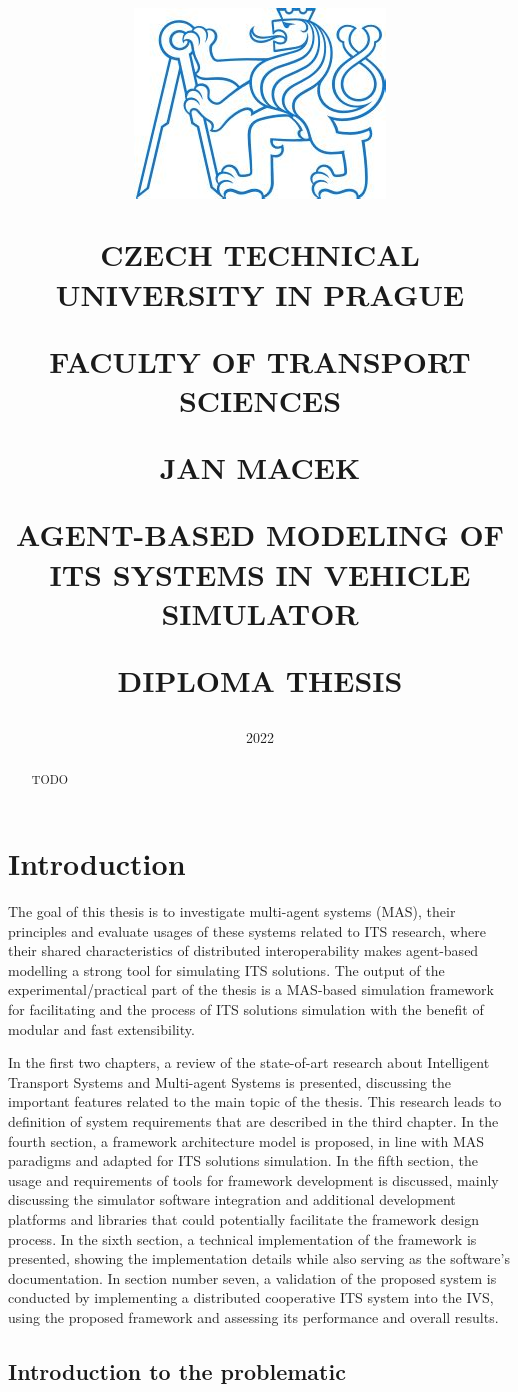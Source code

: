 \documentclass[titlepage, 12pt]{article}
\title{
\includegraphics[width=.3\textwidth]{cvut-logo.jpg}\par
\vspace{10mm}
\indent
\textbf{CZECH TECHNICAL UNIVERSITY IN PRAGUE}

FACULTY OF TRANSPORT SCIENCES

\vfill

{\Large JAN MACEK}
\vspace{10mm}

AGENT-BASED MODELING OF ITS SYSTEMS IN VEHICLE SIMULATOR 
\vspace{15mm}

{\Large DIPLOMA THESIS}
\vfill

}
\date{\Large 2022}
\begin{document}
\setlength{\baselineskip}{1.5em}
\maketitle



\begin{abstract}
    TODO
\end{abstract}

\tableofcontents
\newpage

\section{Introduction}

The goal of this thesis is to investigate multi-agent systems (MAS), their 
principles and evaluate usages of these systems related to ITS research, where 
their shared characteristics of distributed interoperability makes
agent-based modelling a strong tool for simulating ITS solutions. The output of 
the experimental/practical part of the thesis is a MAS-based simulation framework 
for facilitating and the process of ITS solutions simulation with the benefit 
of modular and fast extensibility.



In the first two chapters, a review of the state-of-art research about Intelligent 
Transport Systems and Multi-agent Systems is presented, discussing the important 
features related to the main topic of the thesis. This research leads to definition of system
requirements that are described in the third chapter. In the 
fourth section, a framework architecture model is proposed, in line with 
MAS paradigms and adapted for ITS solutions simulation. In the fifth section, the
usage and requirements of tools for framework development is discussed, mainly discussing the simulator software integration
and additional development platforms and libraries that could potentially facilitate the
framework design process. In the sixth section, a technical implementation of the 
framework is presented, showing the implementation details while also serving as the 
software's documentation. In section number seven, a validation of the proposed 
system is conducted by implementing a distributed cooperative ITS system into the
IVS, using the proposed framework and assessing its performance and overall results.

\subsection{Introduction to the problematic}
\end{document}
